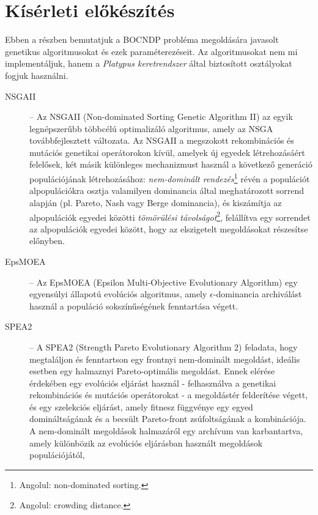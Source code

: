 \section{Kísérleti előkészítés}\label{sec:KISERLETI_ELOKESZITES}

Ebben a részben bemutatjuk a BOCNDP probléma megoldására javasolt genetikus algoritmusokat és ezek paraméterezéseit.
Az algoritmusokat nem mi implementáljuk, hanem a \emph{Platypus keretrendszer} \cite{hadka2017platypus} által biztosított osztályokat fogjuk használni.

\begin{description}
      \item[NSGAII] -- Az NSGAII (Non-dominated Sorting Genetic Algorithm II) \cite{deb2002fast} az egyik legnépszerűbb többcélú optimalizáló algoritmus,
            amely az NSGA továbbfejlesztett változata. Az NSGAII a megszokott rekombinációs és mutációs genetikai operátorokon kívül,
            amelyek új egyedek létrehozásáért felelősek, két másik különleges mechanizmust használ a következő generáció populációjának létrehozásához:
            \textit{nem-dominált rendezés}\footnote{ Angolul: non-dominated sorting. } révén a populációt alpopulációkra
            osztja valamilyen dominancia által meghatározott sorrend alapján (pl. Pareto, Nash vagy Berge dominancia),
            és kiszámítja az alpopulációk egyedei közötti \textit{tömörülési távolságot}\footnote{ Angolul: crowding distance. },
            felállítva egy sorrendet az alpopulációk egyedei között, hogy az elszigetelt megoldásokat részesítse előnyben.
      \item[EpsMOEA] -- Az EpsMOEA (Epsilon Multi-Objective Evolutionary Algorithm) \cite{deb2003towards} egy egyensúlyi állapotú evolúciós algoritmus,
            amely $\epsilon$-dominancia archiválást használ a populáció sokszínűségének fenntartása végett.
      \item[SPEA2] -- A SPEA2 (Strength Pareto Evolutionary Algorithm 2) \cite{zitzler2001spea2} feladata, hogy megtaláljon és fenntartson egy frontnyi nem-dominált megoldást,
            ideális esetben egy halmaznyi Pareto-optimális megoldást. Ennek elérése érdekében egy evolúciós eljárást használ
            - felhasználva a genetikai rekombinációs és mutációs operátorokat - a megoldástér felderítése végett,
            és egy szelekciós eljárást, amely fitnesz függvénye egy egyed domináltságának és a becsült Pareto-front zsúfoltságának a kombinációja.
            A nem-dominált megoldások halmazáról egy archívum van karbantartva, amely különbözik az evolúciós eljárásban használt megoldások populációjától,

\end{description}

